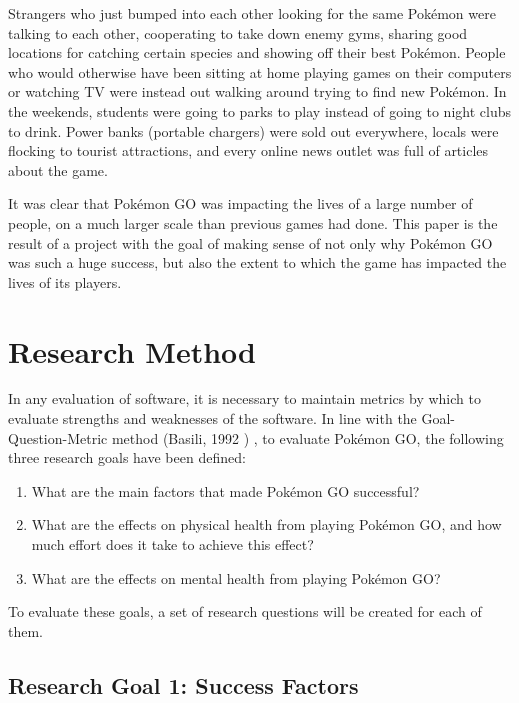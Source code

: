 Strangers who just bumped into each other looking for the same Pokémon were talking to each other, cooperating to take down enemy gyms, sharing good locations for catching certain species and showing off their best Pokémon. People who would otherwise have been sitting at home playing games on their computers or watching TV were instead out walking around trying to find new Pokémon. In the weekends, students were going to parks to play instead of going to night clubs to drink.  Power banks (portable chargers) were sold out everywhere, locals were flocking to tourist attractions, and every online news outlet was full of articles about the game.

It was clear that Pokémon GO was impacting the lives of a large number of people, on a much larger scale than previous games had done. This paper is the result of a project with the goal of making sense of not only why Pokémon GO was such a huge success, but also the extent to which the game has impacted the lives of its players.


\chapter{Research Method}
\label{chapter:research-questions}

In any evaluation of software, it is necessary to maintain metrics by which to evaluate strengths and weaknesses of the software. In line with the Goal-Question-Metric method (Basili, 1992 \cite{basili1992gqm}) , to evaluate Pokémon GO, the following three research goals have been defined:

\begin{enumerate}[label=RG{\arabic*}]
	\item What are the main factors that made Pokémon GO successful?
	\item What are the effects on physical health from playing Pokémon GO, and how much effort does it take to achieve this effect?
	\item What are the effects on mental health from playing Pokémon GO?
\end{enumerate}

To evaluate these goals, a set of research questions will be created for each of them.

\section{Research Goal 1: Success Factors}
\label{rg1}

